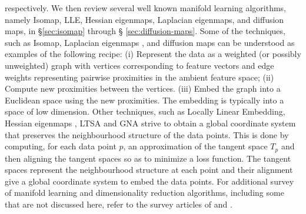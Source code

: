 respectively. We then review several well known manifold learning
algorithms, namely Isomap, LLE, Hessian eigenmaps, Laplacian
eigenmaps, and diffusion maps, in \S \ref{sec:isomap} through \S
\ref{sec:diffusion-maps}. Some of the techniques, such as Isomap,
Laplacian eigenmaps \citep{belkin03:_laplac}, and diffusion maps
\citep{coifman06:_diffus_maps} can be understood as examples of the
following recipe: (i) Represent the data as a weighted (or possibly
unweighted) graph with vertices corresponding to feature vectors and
edge weights representing pairwise proximities in the ambient feature
space; (ii) Compute new proximities between the vertices. (iii) Embed
the graph into a Euclidean space using the new proximities. The
embedding is typically into a space of low dimension. Other
techniques, such as Locally Linear Embedding, Hessian eigenmaps
\citep{donoho03:_hesian}, LTSA
\citep{zhang03:_intel_data_engin_autom_learn} and GNA
\citep{brand05:_from} strive to obtain a global coordinate system that
preserves the neighbourhood structure of the data points. This is done
by computing, for each data point $p$, an approximation of the tangent
space $T_p$ and then aligning the tangent spaces so as to minimize a
loss function. The tangent spaces represent the neighbourhood
structure at each point and their alignment give a global coordinate
system to embed the data points. For additional survey of manifold
learning and dimensionality reduction algorithms, including some that
are not discussed here, refer to the survey articles of
\citet{burges05:_data} and
\citet{saul06:_semis}. 

